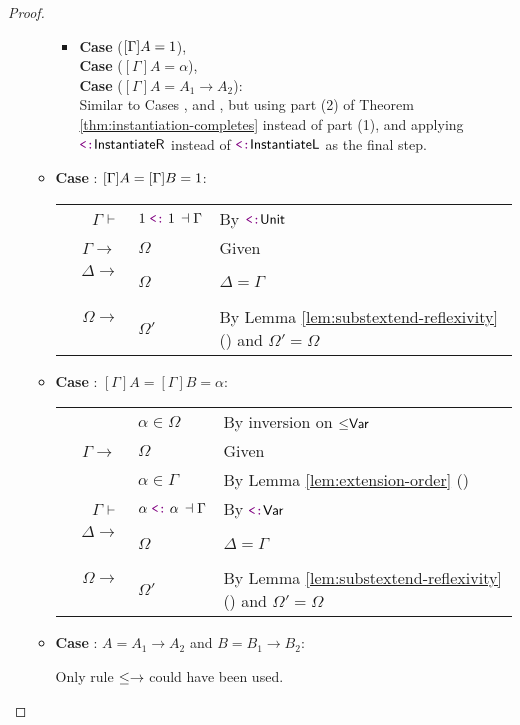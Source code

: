 \documentclass[a4paper]{article}
\makeatletter
\newcommand{\arr}{\rightarrow}
\def\CompactJudgments{0}
\newcommand{\entails}{\mathrel{\ifnum\CompactJudgments=1\vdash \else \vdash\,\fi}}
\newcommand{\ctxoutsym}{\ifnum\CompactJudgments=1\dashv \else \,\dashv \fi}
\newcommand{\ctxout}[1]{\mathrel{\ctxoutsym}{#1}}
\newcommand{\tyname}[1]{\textsf{\normalfont #1}}
\newcommand{\unitty}{\tyname{1}}
\newcommand{\subtypingycolor}[1]{\textcolor{dDigPurple}{#1}}
\newcommand{\subtype}{\mathrel{\normalfont\texttt{\subtypingycolor{<:}}}}  \newcommand{\declsubtype}{\mathrel{\leq}}
\newcommand{\Theoremref}[1]{Theorem \ref{#1}}
\newcommand{\Lemmaref}[1]{Lemma \ref{#1} (\nameref{#1})}   \newcommand{\Lemref}[1]{\Lemma \ref{#1}}   \newcommand{\Conjectureref}[1]{Conjecture \ref{#1}}
\newcommand{\BeginProof}{\renewcommand{\arraystretch}{1.1} \begin{tabular}[b]{r@{}r @{} l  l}}
\newcommand{\EndProof}{\end{tabular} \renewcommand{\arraystretch}{\mydefaultarraystretch}}
\newcommand{\Hand}{\text{\Pointinghand~~~~}}
\newcommand{\Pf}[4] {&$#1$ $#2$\, & $#3$ & #4 \\}
\newcommand{\Pfmrg}[3] {&$#1$\, & $#2$ & #3 \\}
\newenvironment{llproof}{\BeginProof}{\EndProof}
\newcommand{\subjudgPf}[5] {\Pf{#1}{\entails}{{#2} \subtype {#3} \ctxout{#4}}{#5}}
\newcommand{\substextendPf}[3] {\Pfmrg{{#1} \extendssym\,}{#2}{#3}}
\newcommand{\extendssym}{\longrightarrow}
\newcommand{\rulename}[1]{\text{\normalfont\textsf{#1}}}
\newcommand{\Dsubrulename}[1]{\ensuremath{{\declsubtype}\rulename{#1}}\xspace}
\newcommand{\DsubVar}{\Dsubrulename{Var}}
\newcommand{\DsubArr}{\Dsubrulename{\ensuremath{\arr}}}
\newcommand{\Subrulename}[1]{\ensuremath{{\subtype}\rulename{#1}}\xspace}
\newcommand{\SubVar}{\Subrulename{Var}}
\newcommand{\SubUnit}{\Subrulename{Unit}}
\newcommand{\SubInst}[1]{\Subrulename{Instantiate{#1}}}
\newcommand{\SubInstL}{\SubInst{L}}
\newcommand{\SubInstR}{\SubInst{R}}
\makeatother
\begin{document}
\begin{proof}
\begin{itemize}
\begin{itemize}
            \begin{itemize}
            \item \textbf{Case } ($[\Gamma]A = \unitty$), \\
                  \textbf{Case } ($[\Gamma]A = \alpha$), \\
                  \textbf{Case } ($[\Gamma]A = A_1 \arr A_2$): \\
                Similar to Cases ,  and ,
                but using part (2) of \Theoremref{thm:instantiation-completes} instead of part (1),
                and applying \SubInstR instead of \SubInstL as the final step.
            \end{itemize}

    \item \textbf{Case }: $[\Gamma]A = [\Gamma]B = \unitty$:

      \begin{llproof}
\Hand        \subjudgPf{\Gamma}{\unitty}{\unitty}{\Gamma}   {By \SubUnit}
          \substextendPf{\Gamma} {\Omega}   {Given}
\Hand          \substextendPf{\Delta} {\Omega}   {$\Delta = \Gamma$}
\Hand          \substextendPf{\Omega} {\Omega'}   {By \Lemmaref{lem:substextend-reflexivity} and $\Omega' = \Omega$}
      \end{llproof}
      


    \item \textbf{Case }: $[\Gamma]A = [\Gamma]B = \alpha$:      

      \begin{llproof}
         \Pf{}{}{\alpha \in \Omega}  {By inversion on \DsubVar}
         \substextendPf{\Gamma}{\Omega}   {Given}
         \Pf{}{}{\alpha \in \Gamma} {By \Lemmaref{lem:extension-order}}
\Hand         \subjudgPf{\Gamma}{\alpha}{\alpha}{\Gamma}  {By \SubVar}
\Hand         \substextendPf{\Delta} {\Omega}   {$\Delta = \Gamma$}
\Hand         \substextendPf{\Omega} {\Omega'}   {By \Lemmaref{lem:substextend-reflexivity} and $\Omega' = \Omega$}        
      \end{llproof}
      


    \item \textbf{Case }: $A = A_1 \arr A_2$ and $B = B_1 \arr B_2$:

      Only rule \DsubArr could have been used.


\end{itemize}
\end{itemize}
\end{proof}
\end{document}
